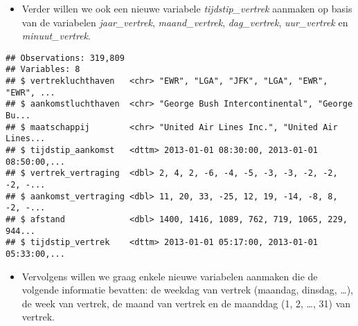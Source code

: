 \documentclass[]{memoir}
\newenvironment{Shaded}{\begin{snugshade}}{\end{snugshade}}
\newcommand{\DataTypeTok}[1]{\textcolor[rgb]{0.13,0.29,0.53}{#1}}
\newcommand{\KeywordTok}[1]{\textcolor[rgb]{0.13,0.29,0.53}{\textbf{#1}}}
\newcommand{\NormalTok}[1]{#1}
\newcommand{\OperatorTok}[1]{\textcolor[rgb]{0.81,0.36,0.00}{\textbf{#1}}}
\newcommand{\StringTok}[1]{\textcolor[rgb]{0.31,0.60,0.02}{#1}}
\providecommand{\tightlist}{%
  \setlength{\itemsep}{0pt}\setlength{\parskip}{0pt}}
\begin{document}
\begin{itemize}
\tightlist
\item
  Verder willen we ook een nieuwe variabele \emph{tijdstip\_vertrek} aanmaken op basis van de variabelen \emph{jaar\_vertrek}, \emph{maand\_vertrek}, \emph{dag\_vertrek}, \emph{uur\_vertrek} en \emph{minuut\_vertrek}.
\end{itemize}

\begin{Shaded}
\end{Shaded}

\begin{verbatim}
## Observations: 319,809
## Variables: 8
## $ vertrekluchthaven   <chr> "EWR", "LGA", "JFK", "LGA", "EWR", "EWR", ...
## $ aankomstluchthaven  <chr> "George Bush Intercontinental", "George Bu...
## $ maatschappij        <chr> "United Air Lines Inc.", "United Air Lines...
## $ tijdstip_aankomst   <dttm> 2013-01-01 08:30:00, 2013-01-01 08:50:00,...
## $ vertrek_vertraging  <dbl> 2, 4, 2, -6, -4, -5, -3, -3, -2, -2, -2, -...
## $ aankomst_vertraging <dbl> 11, 20, 33, -25, 12, 19, -14, -8, 8, -2, -...
## $ afstand             <dbl> 1400, 1416, 1089, 762, 719, 1065, 229, 944...
## $ tijdstip_vertrek    <dttm> 2013-01-01 05:17:00, 2013-01-01 05:33:00,...
\end{verbatim}

\begin{itemize}
\tightlist
\item
  Vervolgens willen we graag enkele nieuwe variabelen aanmaken die de volgende informatie bevatten: de weekdag van vertrek (maandag, dinsdag, \ldots{}), de week van vertrek, de maand van vertrek en de maanddag (1, 2, \ldots{}, 31) van vertrek.
\end{itemize}
\end{document}
